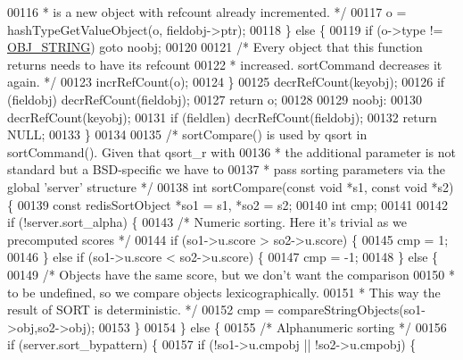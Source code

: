 \begin{DoxyCode}
00116 \textcolor{comment}{         * is a new object with refcount already incremented. */}
00117         o = hashTypeGetValueObject(o, fieldobj->ptr);
00118     \} \textcolor{keywordflow}{else} \{
00119         \textcolor{keywordflow}{if} (o->type != \hyperlink{server_8h_a65236ea160f69cdef33ec942092af88f}{OBJ\_STRING}) \textcolor{keywordflow}{goto} noobj;
00120 
00121         \textcolor{comment}{/* Every object that this function returns needs to have its refcount}
00122 \textcolor{comment}{         * increased. sortCommand decreases it again. */}
00123         incrRefCount(o);
00124     \}
00125     decrRefCount(keyobj);
00126     \textcolor{keywordflow}{if} (fieldobj) decrRefCount(fieldobj);
00127     \textcolor{keywordflow}{return} o;
00128 
00129 noobj:
00130     decrRefCount(keyobj);
00131     \textcolor{keywordflow}{if} (fieldlen) decrRefCount(fieldobj);
00132     \textcolor{keywordflow}{return} NULL;
00133 \}
00134 
00135 \textcolor{comment}{/* sortCompare() is used by qsort in sortCommand(). Given that qsort\_r with}
00136 \textcolor{comment}{ * the additional parameter is not standard but a BSD-specific we have to}
00137 \textcolor{comment}{ * pass sorting parameters via the global 'server' structure */}
00138 \textcolor{keywordtype}{int} sortCompare(\textcolor{keyword}{const} \textcolor{keywordtype}{void} *s1, \textcolor{keyword}{const} \textcolor{keywordtype}{void} *s2) \{
00139     \textcolor{keyword}{const} redisSortObject *so1 = s1, *so2 = s2;
00140     \textcolor{keywordtype}{int} cmp;
00141 
00142     \textcolor{keywordflow}{if} (!server.sort\_alpha) \{
00143         \textcolor{comment}{/* Numeric sorting. Here it's trivial as we precomputed scores */}
00144         \textcolor{keywordflow}{if} (so1->u.score > so2->u.score) \{
00145             cmp = 1;
00146         \} \textcolor{keywordflow}{else} \textcolor{keywordflow}{if} (so1->u.score < so2->u.score) \{
00147             cmp = -1;
00148         \} \textcolor{keywordflow}{else} \{
00149             \textcolor{comment}{/* Objects have the same score, but we don't want the comparison}
00150 \textcolor{comment}{             * to be undefined, so we compare objects lexicographically.}
00151 \textcolor{comment}{             * This way the result of SORT is deterministic. */}
00152             cmp = compareStringObjects(so1->obj,so2->obj);
00153         \}
00154     \} \textcolor{keywordflow}{else} \{
00155         \textcolor{comment}{/* Alphanumeric sorting */}
00156         \textcolor{keywordflow}{if} (server.sort\_bypattern) \{
00157             \textcolor{keywordflow}{if} (!so1->u.cmpobj || !so2->u.cmpobj) \{

\end{DoxyCode}
